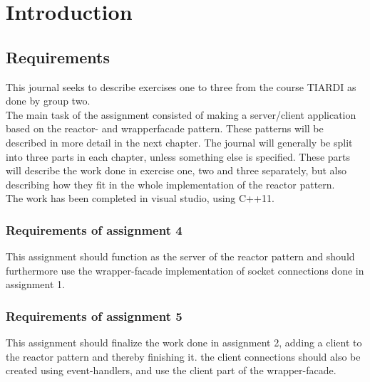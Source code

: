 \documentclass[Main]{subfiles}
\begin{document}
\chapter{Introduction}
\section{Requirements}
This journal seeks to describe exercises one to three from the course TIARDI as done by group two. \\
The main task of the assignment consisted of making a server/client application based on the reactor- and wrapperfacade pattern. 
These patterns will be described in more detail in the next chapter. 
The journal will generally be split into three parts in each chapter, unless something else is specified. 
These parts will describe the work done in exercise one, two and three separately, but also describing how they fit in the whole implementation of the reactor pattern. \\
The work has been completed in visual studio, using C++11.

\subsection{Requirements of assignment 4}
This assignment should function as the server of the reactor pattern and should furthermore use the wrapper-facade implementation of socket connections done in assignment 1. 

\subsection{Requirements of assignment 5}
This assignment should finalize the work done in assignment 2, adding a client to the reactor pattern and thereby finishing it. the client connections should also be created using event-handlers, and use the client part of the wrapper-facade.


\end{document}
